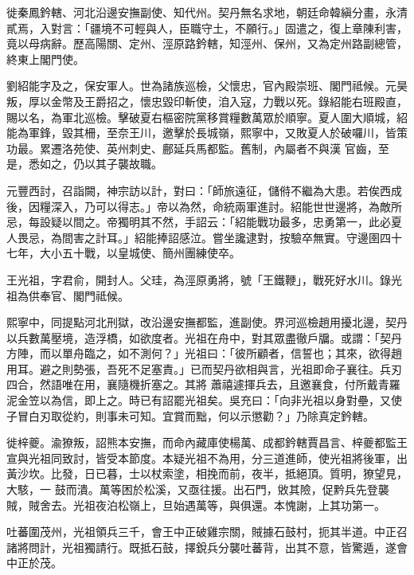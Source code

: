 \begin{pinyinscope}
 徙秦鳳鈐轄、河北沿邊安撫副使、知代州。契丹無名求地，朝廷命韓縝分畫，永清貳焉，入對言：「疆境不可輕與人，臣職守土，不願行。」固遣之，復上章陳利害，竟以母病辭。歷高陽關、定州、涇原路鈐轄，知涇州、保州，又為定州路副總管，
 終東上閣門使。



 劉紹能字及之，保安軍人。世為諸族巡檢，父懷忠，官內殿崇班、閣門祗候。元昊叛，厚以金幣及王爵招之，懷忠毀印斬使，洎入寇，力戰以死。錄紹能右班殿直，賜以名，為軍北巡檢。擊破夏右樞密院黨移賞糧數萬眾於順寧。夏人圍大順城，紹能為軍鋒，毀其柵，至奈王川，邀擊於長城嶺，熙寧中，又敗夏人於破囉川，皆策功最。累遷洛苑使、英州刺史、鄜延兵馬都監。舊制，內屬者不與漢
 官齒，至是，悉如之，仍以其子襲故職。



 元豐西討，召詣闕，神宗訪以計，對曰：「師旅遠征，儲偫不繼為大患。若俟西成後，因糧深入，乃可以得志。」帝以為然，命統兩軍進討。紹能世世邊將，為敵所忌，每設疑以間之。帝獨明其不然，手詔云：「紹能戰功最多，忠勇第一，此必夏人畏忌，為間害之計耳。」紹能捧詔感泣。嘗坐讒逮對，按驗卒無實。守邊圉四十七年，大小五十戰，以皇城使、簡州團練使卒。



 王光祖，字君俞，開封人。父珪，為涇原勇將，號「王鐵鞭」，戰死好水川。錄光祖為供奉官、閣門祗候。



 熙寧中，同提點河北刑獄，改沿邊安撫都監，進副使。界河巡檢趙用擾北邊，契丹以兵數萬壓境，造浮橋，如欲度者。光祖在舟中，對其眾盡徹戶牖。或謂：「契丹方陣，而以單舟臨之，如不測何？」光祖曰：「彼所顧者，信誓也；其來，欲得趙用耳。避之則勢張，吾死不足塞責。」已而契丹欲相與言，光祖即命子襄往。兵刃四合，然語唯在用，襄隨機折塞之。其將
 蕭禧遽揮兵去，且邀襄食，付所戴青羅泥金笠以為信，即上之。時已有詔罷光祖矣。吳充曰：「向非光祖以身對壘，又使子冒白刃取從約，則事未可知。宜賞而黜，何以示懲勸？」乃除真定鈐轄。



 徙梓夔。渝獠叛，詔熊本安撫，而命內藏庫使楊萬、成都鈐轄賈昌言、梓夔都監王宣與光祖同致討，皆受本節度。本疑光祖不為用，分三道進師，使光祖將後軍，出黃沙坎。比發，日已暮，士以杖索塗，相挽而前，夜半，抵絕頂。質明，獠望見，大駭，一
 鼓而潰。萬等困於松溪，又亟往援。出石門，敓其險，促黔兵先登襲賊，賊舍去。光祖夜泊松嶺上，旦始遇萬等，與俱還。本愧謝，上其功第一。



 吐蕃圍茂州，光祖領兵三千，會王中正破雞宗關，賊據石鼓村，扼其半道。中正召諸將問計，光祖獨請行。既抵石鼓，擇銳兵分襲吐蕃背，出其不意，皆驚遁，遂會中正於茂。




\end{pinyinscope}
